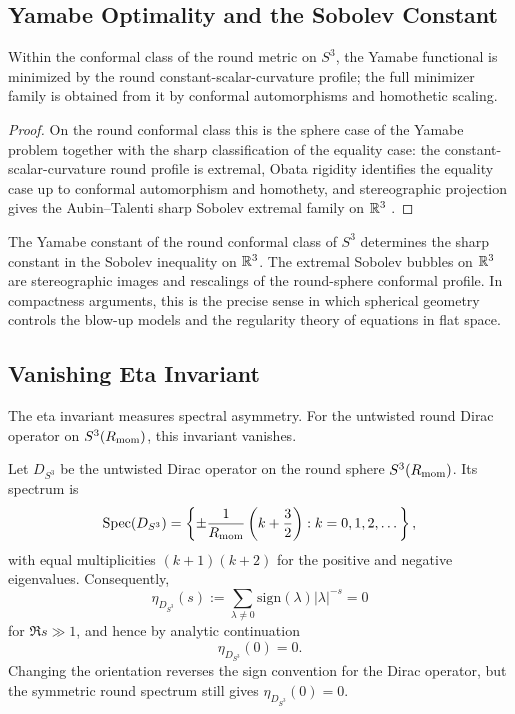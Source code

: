 \documentclass[11pt]{article}
\begin{document}
\subsection{Yamabe Optimality and the Sobolev Constant}
\label{p1:der:yamabe}
\begin{theorem}
\label{p1:thm:yamabe-round-sphere}
Within the conformal class of the round metric on \(S^3\), the Yamabe functional is minimized by the round constant-scalar-curvature profile; the full minimizer family is obtained from it by conformal automorphisms and homothetic scaling.
\end{theorem}

\begin{proof}
On the round conformal class this is the sphere case of the Yamabe problem together with the sharp classification of the equality case: the constant-scalar-curvature round profile is extremal, Obata rigidity identifies the equality case up to conformal automorphism and homothety, and stereographic projection gives the Aubin--Talenti sharp Sobolev extremal family on \(\mathbb{R}^3\) \cite{Yamabe1960,Trudinger1968,Aubin1976,Obata1962,Talenti1976}.
\end{proof}

\begin{remark}
The Yamabe constant of the round conformal class of \(S^3\) determines the sharp constant in the Sobolev inequality on \(\mathbb{R}^3\). The extremal Sobolev bubbles on $\mathbb{R}^3$ are stereographic images and rescalings of the round-sphere conformal profile. In compactness arguments, this is the precise sense in which spherical geometry controls the blow-up models and the regularity theory of equations in flat space.
\end{remark}

\subsection{Vanishing Eta Invariant}
\label{p1:der:eta}
The eta invariant measures spectral asymmetry.
For the untwisted round Dirac operator on \(S^3(R_{\mathrm{mom}})\), this invariant
vanishes.
\begin{proposition}
\label{p1:prop:eta-round-zero}
Let $D_{S^3}$ be the untwisted Dirac operator on the round sphere $S^3(R_{\mathrm{mom}})$.
Its spectrum is
\[
\mathrm{Spec}(D_{S^3})
=
\left\{
\pm \frac{1}{R_{\mathrm{mom}}}\left(k+\frac32\right): k=0,1,2,\dots
\right\},
\]
with equal multiplicities $(k+1)(k+2)$ for the positive and negative
eigenvalues. Consequently,
\[
\eta_{D_{S^3}}(s)
:=
\sum_{\lambda\neq 0}\mathrm{sign}(\lambda)|\lambda|^{-s}
=0
\]
for $\Re s\gg 1$, and hence by analytic continuation
\[
\eta_{D_{S^3}}(0)=0.
\]
Changing the orientation reverses the sign convention for the Dirac operator, but the symmetric round spectrum still gives \(\eta_{D_{S^3}}(0)=0\).
\end{proposition}
\end{document}

